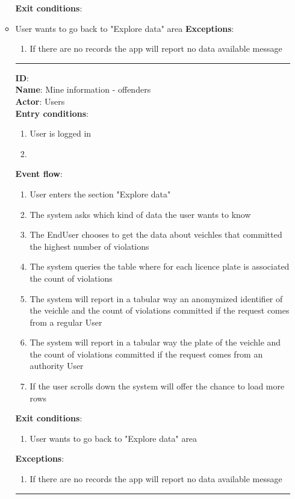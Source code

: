 \begin{enumerate}
\begin{itemize}
\begin{enumerate}
		\end{enumerate}
		\textbf{Exit conditions}:
          \item{User wants to go back to "Explore data" area}
		\textbf{Exceptions}:
    \begin{enumerate}
      \item{If there are no records the app will report no data available message}
    \end{enumerate}
		\rule{\linewidth}{0.4pt}
		\textbf{ID}:  \\
		\textbf{Name}: Mine information - offenders \\
		\textbf{Actor}: Users   \\
		\textbf{Entry conditions}:
		\begin{enumerate}
			\item{User is logged in}
			\item{ }
		\end{enumerate}
		\textbf{Event flow}:
		\begin{enumerate}
			\item{User enters the section "Explore data"}
			\item{The system asks which kind of data the user wants to know}
      \item{The EndUser chooses to get the data about veichles that committed the highest number of violations}
      \item{The system queries the table where for each licence plate is associated the count of violations }
      \item{The system will report in a tabular way an anomymized identifier of the veichle and the count of violations committed if the request comes from a regular User}
      \item{The system will report in a tabular way the plate of the veichle and the count of violations committed if the request comes from an authority User}
      \item{If the user scrolls down the system will offer the chance to load more rows}
		\end{enumerate}
		\textbf{Exit conditions}:
    \begin{enumerate}
      \item{User wants to go back to "Explore data" area}
    \end{enumerate}
		\textbf{Exceptions}:
		\begin{enumerate}
			\item{If there are no records the app will report no data available message}
		\end{enumerate}
		\rule{\linewidth}{0.4pt}















\end{itemize}
\end{enumerate}
